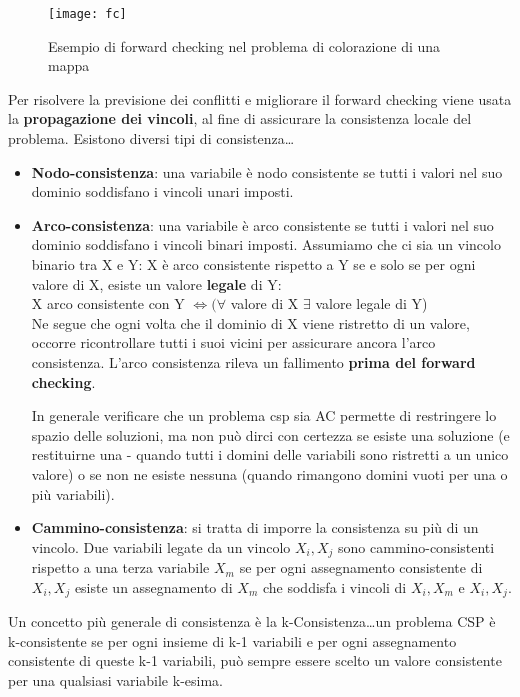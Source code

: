 \begin{figure}[H]
\centering
\texttt{[image: fc]}
\caption{Esempio di forward checking nel problema di colorazione di una mappa}
\label{fig:fc}
\end{figure}

Per risolvere la previsione dei conflitti e migliorare il forward checking viene
usata la \textbf{propagazione dei vincoli}, al fine di assicurare la
consistenza locale del problema. Esistono diversi tipi di consistenza\dots

\begin{itemize}
 \item \textbf{Nodo-consistenza}: una variabile è nodo consistente se tutti
i valori nel suo dominio soddisfano i vincoli unari imposti.
 \item \textbf{Arco-consistenza}: una variabile è arco consistente se tutti
i valori nel suo dominio soddisfano i vincoli binari imposti.
Assumiamo che ci sia un vincolo binario tra X e Y: X è arco consistente
rispetto a Y se e solo se per ogni valore di X, esiste un valore \textbf{legale}
di Y:\\

X arco consistente con Y $\iff (\forall$ valore di X $\exists$ valore legale
di Y)\\

Ne segue che ogni volta che il dominio di X viene ristretto di un valore,
occorre ricontrollare tutti i suoi vicini per assicurare ancora l'arco consistenza.
L'arco consistenza rileva un fallimento \textbf{prima del forward checking}.

In generale verificare che un problema csp sia AC permette di restringere lo spazio
delle soluzioni, ma non può dirci con certezza se esiste una soluzione (e
restituirne una - quando tutti i domini delle variabili sono ristretti a un unico
valore) o se non ne esiste nessuna (quando rimangono domini vuoti per una o più variabili).
 \item \textbf{Cammino-consistenza}: si tratta di imporre la consistenza su più di un
vincolo. Due variabili legate da un vincolo ${X_i, X_j}$ sono cammino-consistenti rispetto
a una terza variabile $X_m$ se per ogni assegnamento consistente di
${X_i, X_j}$ esiste un assegnamento di $X_m$ che soddisfa i vincoli di ${X_i, X_m}$
e ${X_i, X_j}$.
\end{itemize}

Un concetto più generale di consistenza è la k-Consistenza\dots un problema
CSP è k-consistente se per ogni insieme di k-1 variabili e per ogni assegnamento
consistente di queste k-1 variabili, può sempre essere scelto un valore consistente
per una qualsiasi variabile k-esima.

